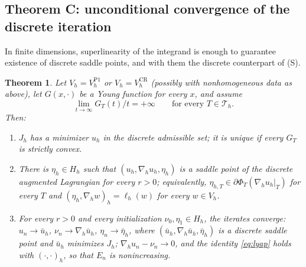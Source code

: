 \documentclass[11pt]{amsart}
\newtheorem{maintheorem}{Theorem}
\theoremstyle{definition}
\theoremstyle{remark}
\numberwithin{equation}{section}
\newcommand{\CR}{\mathrm{CR}}
\newcommand{\Pone}{\mathrm{P1}}
\newcommand{\Th}{\mathcal T_h}
\begin{document}
\subsection{Theorem C: unconditional convergence of the discrete iteration}
In finite dimensions, superlinearity of the integrand is enough to guarantee existence of discrete saddle points, and with them the discrete counterpart of (S).
\begin{maintheorem}\label{thm:C}
Let $V_h=V_h^{\Pone}$ or $V_h=V_h^{\CR}$ \textup(possibly with nonhomogeneous data as above\textup), let $G(x,\cdot)$ be a Young function for every $x$, and assume
\begin{equation}\label{eq:superlinear}
\lim_{t\to\infty}G_T(t)/t=+\infty\qquad\text{for every }T\in\Th .
\end{equation}
Then:
\begin{enumerate}[label=\textup{(\roman*)}]
\item $J_h$ has a minimizer $u_h$ in the discrete admissible set; it is unique if every $G_T$ is strictly convex.
\item There is $\eta_h\in H_h$ such that $(u_h,\nabla_hu_h,\eta_h)$ is a saddle point of the discrete augmented Lagrangian for every $r>0$; equivalently, $\eta_{h,T}\in\partial\Phi_T(\nabla_hu_h|_T)$ for every $T$ and $(\eta_h,\nabla_hw)_h=\ell_h(w)$ for every $w\in V_h$.
\item For every $r>0$ and every initialization $\nu_0,\eta_1\in H_h$, the iterates converge: $u_n\to\bar u_h$, $\nu_n\to\nabla_h\bar u_h$, $\eta_n\to\bar\eta_h$, where $(\bar u_h,\nabla_h\bar u_h,\bar\eta_h)$ is a discrete saddle point and $\bar u_h$ minimizes $J_h$; $\nabla_hu_n-\nu_n\to0$, and the identity \eqref{eq:lyap} holds with $(\cdot,\cdot)_h$, so that $E_n$ is nonincreasing.
\end{enumerate}
\end{maintheorem}
\end{document}
